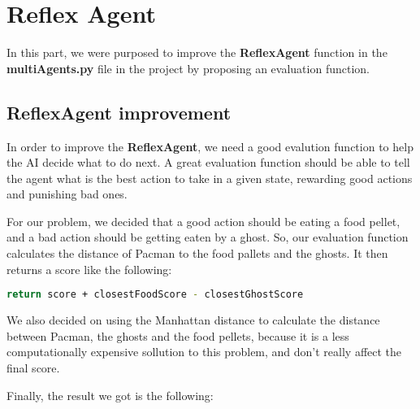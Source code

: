 \documentclass{article}
\begin{document}
\pagebreak
\section{Reflex Agent}

In this part, we were purposed to improve the \textbf{ReflexAgent} function in the \textbf{multiAgents.py} file in the project by proposing an evaluation function.

\subsection{ReflexAgent improvement}

In order to improve the \textbf{ReflexAgent}, we need a good evalution function to help the AI decide what to do next. A great evaluation function should be able to tell the agent what is the best action to take in a given state, rewarding good actions and punishing bad ones.

For our problem, we decided that a good action should be eating a food pellet, and a bad action should be getting eaten by a ghost. So, our evaluation function calculates the distance of Pacman to the food pallets and the ghosts. It then returns a score like the following:

\hbox{}

\begin{lstlisting}[language=bash, frame=tlbr, framesep=6pt, backgroundcolor=\color{light-gray}]
    return score + closestFoodScore - closestGhostScore
\end{lstlisting}

\hbox{}

We also decided on using the Manhattan distance to calculate the distance between Pacman, the ghosts and the food pellets, because it is a less computationally expensive sollution to this problem, and don't really affect the final score.

\hbox{}

Finally, the result we got is the following:

\hbox{}
\end{document}
